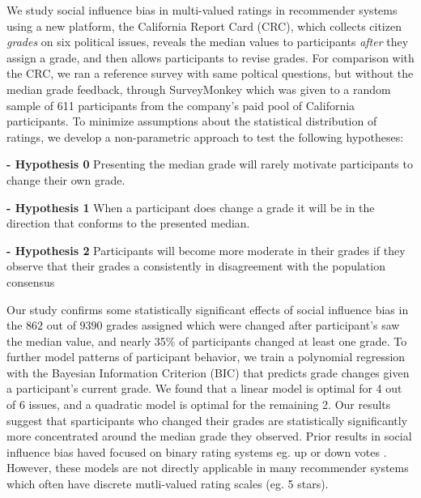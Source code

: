 We study social influence bias in multi-valued ratings in recommender systems using a new platform, the California Report Card (CRC), which collects citizen \emph{grades} on six political issues, reveals the median values to participants \emph{after} they assign a grade, and then allows participants to revise grades.
For comparison with the CRC, we ran a reference survey with same poltical questions, but without the median grade feedback, through SurveyMonkey which was given to a random sample of 611 participants from the company's paid pool of California participants.
To minimize assumptions about the statistical distribution of ratings, we develop a non-parametric approach to test the following hypotheses:

\noindent \textbf{- Hypothesis 0} Presenting the median grade will rarely motivate participants to change their own grade.

\noindent \textbf{- Hypothesis 1} When a participant does change a grade it will be in the direction that conforms to the presented median.

\noindent \textbf{- Hypothesis 2} Participants will become more moderate in their grades if they observe that their grades a consistently in disagreement with the population consensus

Our study confirms some statistically significant effects of social influence bias in the $862$ out of $9390$ grades assigned which were changed after participant's saw the median value, and nearly 35\% of participants changed at least one grade.
To further model patterns of participant behavior, we train a polynomial regression with the Bayesian Information Criterion (BIC) that predicts grade changes given a participant's current grade.
We found that a linear model is optimal for 4 out of 6 issues, and a quadratic model is optimal for the remaining 2.
Our results suggest that sparticipants who changed their grades are statistically significantly more concentrated around the median grade they observed.
Prior results in social influence bias haved focused on binary rating systems eg. up or down votes \cite{muchnik2013social, zhu2012switch}.
However, these models are not directly applicable in many recommender systems which often have discrete mutli-valued rating scales (eg. 5 stars).

